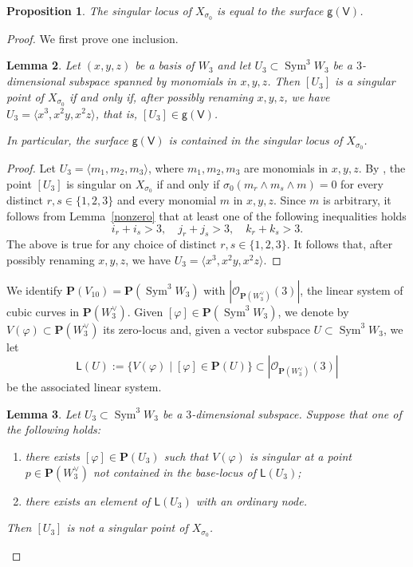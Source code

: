 \documentclass[JEP,XML,SOM,Unicode, NoEqCountersInSection,NoFloatCountersInSection]{cedram}
\let\mathcal\mathscr
\newenvironment{enumeratea}
{\bgroup\def\theenumi{\alph{enumi}}\def\theenumii{\arabic{enumii}}\begin{enumerate}}
{\end{enumerate}\egroup}
\newtheorem{lemm}{Lemma}[section]
\newtheorem{prop}[lemm]{Proposition}
\theoremstyle{definition}
\renewcommand\P{{\mathbf P}}\let\PP\P
\newcommand\cO{\mathcal{O}}\let\OO\cO
\newcommand\sfg{\mathsf{g}}
\newcommand\sfL{\mathsf{L}}
\newcommand\sfV{\mathsf{V}}
\newcommand\gv{\sfg(\sfV)}
\let\phi\varphi
\let\la\langle
\let\ra\rangle
\DeclareMathOperator{\Sym}{Sym}
\begin{document}
\begin{prop}\label{singeffe}
The singular locus of $X_{\sigma_0}$ is equal to the surface $\gv$.
\end{prop}

\begin{proof}
We first prove one inclusion.

\begin{lemm}\label{monsing}
Let $(x,y,z)$ be a basis of $W_{3}$ and let $U_3\subset \Sym^3 \!W_3$ be a $3$-dimensional subspace spanned by monomials in $x,y,z$. Then $[U_3]$ is a singular point of $X_{\sigma_0}$ if and only if, after possibly renaming $x, y, z$, we have $U_3\!=\!\la x^3,x^2y,x^2z\ra$, that is, \hbox{$[ U_3]\!\in\!\gv$}.

In particular, the surface $\gv$ is contained in the singular locus of $X_{\sigma_0}$.
\end{lemm}

\begin{proof}
Let $U_3=\la m_1,m_2,m_3\ra$, where $m_1,m_2,m_3$ are monomials in $x,y,z$. By \cite[Prop.\,3.1]{devo}, the point $[U_3]$
is singular on $X_{\sigma_0}$ if and only if ${\sigma_0}(m_r\wedge m_s\wedge m)=0$ for every distinct $r,s\in\{1,2,3\}$ and every monomial $m$ in $x,y,z$. Since $m$ is arbitrary, it follows from Lemma~\ref{nonzero} that at least one of the
following inequalities holds
\[
i_r+i_s>3,\quad j_r+j_s>3,\quad k_r+k_s>3.
\]
The above is true for any choice of distinct $r,s\in\{1,2,3\}$. It follows that, after possibly renaming $x,y,z$, we have $U_3=\la x^3,x^2y,x^2z\ra$.
\end{proof}

We identify $\P(V_{10})=\P(\Sym^3\! W_3)$ with $|\cO_{\P(W_3^{\vee})}(3)|$, the linear system of cubic curves in $\PP(W^{\vee}_3)$. Given $[\phi]\in \PP(\Sym^3\! W_3)$, we denote by $V(\phi)\subset \P(W_3^{\vee})$ its zero-locus
and, given
a vector subspace $U\subset \Sym^3 \!W_3$, we let
\begin{equation}\label{sistlin}
\sfL(U):=\{V(\phi) \mid [\phi]\in\PP(U)\}\subset |\cO_{\P(W_3^{\vee})}(3)|
\end{equation}
be the associated linear system.

\begin{lemm}\label{primopasso}
Let $U_3\subset \Sym^3 \!W_3$ be a $3$-dimensional subspace. Suppose that one of the following holds:
\begin{enumeratea}
\item\label{primopassoa}
there exists $[\phi]\in \PP(U_3)$ such that $V(\phi)$ is singular at a point $p\in \P(W_3^{\vee})$ not contained in the base-locus of $\sfL(U_3)$;
\item\label{primopassob}
there exists an element of $\sfL(U_3)$ with an ordinary node.
\end{enumeratea}
\noindent
Then $[U_3]$ is not a singular point of $X_{\sigma_0}$.
\end{lemm}


\end{proof}
\end{document}
